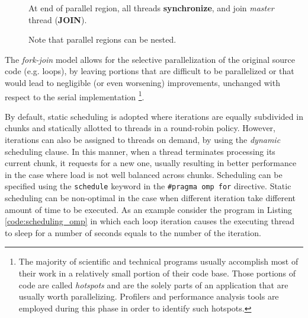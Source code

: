 \begin{description}
\begin{figure}[H]
{\begin{inparaenum}
			\item At end of parallel region, all threads \textbf{synchronize}, and join \textit{master} thread (\textbf{JOIN}).
		\end{inparaenum} Note that parallel regions can be nested.}
	\label{fig:omp_fork-join}
\end{figure}
    The \textit{fork-join} model allows for the selective parallelization of
    the original source code (e.g. loops), by leaving portions that
    are difficult to be parallelized or that would lead to negligible
    (or even worsening) improvements, unchanged with respect to the
    serial implementation \footnote{The majority of scientific and technical programs usually accomplish most of their work in a relatively small portion of their code base. Those portions of code are called \textit{hotspots} and are the solely parts of an application that are usually worth parallelizing. Profilers and performance analysis tools are  employed during this phase in order to identify such hotspots.}.
    
    By default, static scheduling is adopted where iterations are equally
    subdivided in chunks and statically allotted to threads in a
    round-robin policy. However, iterations can also be assigned to
    threads on demand, by using the \textit{dynamic} scheduling clause. In this
    manner, when a thread terminates processing its current chunk, it requests for a new one, usually resulting in better performance in the case where load is not well balanced across chunks.
    Scheduling can be specified using the \texttt{schedule} keyword in the \texttt{\#pragma omp for} directive.
    Static scheduling can be non-optimal in the case when different iteration take different amount of time to be executed. As an example consider the program in Listing \ref{code:scheduling_omp} in which each loop iteration causes the executing thread to sleep for a number of seconds equals to the number of the iteration. 
    

\end{description}
